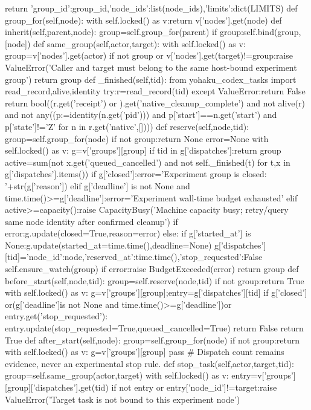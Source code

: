    return {'group_id':group_id,'node_ids':list(node_ids),'limits':dict(LIMITS)}
 def group_for(self,node):
  with self.locked() as v:return v['nodes'].get(node)
 def inherit(self,parent,node):
  group=self.group_for(parent)
  if group:self.bind(group,[node])
 def same_group(self,actor,target):
  with self.locked() as v:
   group=v['nodes'].get(actor)
   if not group or v['nodes'].get(target)!=group:raise ValueError('Caller and target must belong to the same host-bound experiment group')
   return group
 def _finished(self,tid):
  from yohaku_codex_tasks import read_record,alive,identity
  try:r=read_record(tid)
  except ValueError:return False
  return bool((r.get('receipt') or {}).get('native_cleanup_complete') and not alive(r) and not any((p:=identity(n.get('pid'))) and p['start']==n.get('start') and p['state']!='Z' for n in r.get('native',[])))
 def reserve(self,node,tid):
  group=self.group_for(node)
  if not group:return None
  error=None
  with self.locked() as v:
   g=v['groups'][group]
   if tid in g['dispatches']:return group
   active=sum(not x.get('queued_cancelled') and not self._finished(t) for t,x in g['dispatches'].items())
   if g['closed']:error='Experiment group is closed: '+str(g['reason'])
   elif g['deadline'] is not None and time.time()>=g['deadline']:error='Experiment wall-time budget exhausted'
   elif active>=capacity():raise CapacityBusy('Machine capacity busy; retry/query same node identity after confirmed cleanup')
   if error:g.update(closed=True,reason=error)
   else:
    if g['started_at'] is None:g.update(started_at=time.time(),deadline=None)
    g['dispatches'][tid]={'node_id':node,'reserved_at':time.time(),'stop_requested':False}
  self.ensure_watch(group)
  if error:raise BudgetExceeded(error)
  return group
 def before_start(self,node,tid):
  group=self.reserve(node,tid)
  if not group:return True
  with self.locked() as v:
   g=v['groups'][group];entry=g['dispatches'][tid]
   if g['closed'] or(g['deadline']is not None and time.time()>=g['deadline'])or entry.get('stop_requested'):
    entry.update(stop_requested=True,queued_cancelled=True)
    return False
  return True
 def after_start(self,node):
  group=self.group_for(node)
  if not group:return
  with self.locked() as v:
   g=v['groups'][group]
   pass # Dispatch count remains evidence, never an experimental stop rule.
 def stop_task(self,actor,target,tid):
  group=self.same_group(actor,target)
  with self.locked() as v:
   entry=v['groups'][group]['dispatches'].get(tid)
   if not entry or entry['node_id']!=target:raise ValueError('Target task is not bound to this experiment node')
